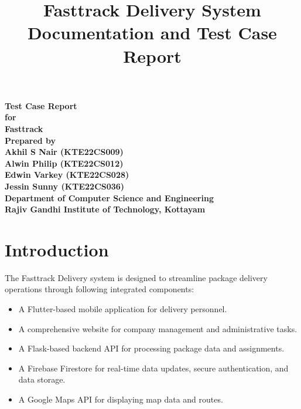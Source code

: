 \documentclass{article}
\title{Fasttrack Delivery System Documentation and Test Case Report}
\begin{document}
\begin{center}
    \textbf{\Huge Test Case Report}\\
    \vspace{30pt}
    \textbf{\Large for}\\
    \vspace{60pt}
    \textbf{\LARGE Fasttrack}\\
    \vspace{40pt}
    \textbf{\large Prepared by}\\
    \vspace{30pt}
   \textbf{\Large Akhil S Nair (KTE22CS009)}\\
\vspace{30pt}
\textbf{\Large Alwin Philip (KTE22CS012)}\\
\vspace{30pt}
\textbf{\Large Edwin Varkey (KTE22CS028)}\\
\vspace{30pt}
\textbf{\Large Jessin Sunny (KTE22CS036)}\\
    \vspace{70pt}
    \textbf{Department of Computer Science and Engineering}\\
    \vspace{20pt}
    \textbf{Rajiv Gandhi Institute of Technology, Kottayam}
\end{center}
\newpage
\tableofcontents
\newpage

\section{Introduction}
The Fasttrack Delivery system is designed to streamline package delivery operations through following integrated components:
\begin{itemize}
    \item A Flutter-based mobile application for delivery personnel.
    \item A comprehensive website for company management and administrative tasks.
    \item A Flask-based backend API for processing package data and assignments.
    \item A Firebase Firestore for real-time data updates, secure authentication, and data storage.
    \item A Google Maps API for displaying map data and routes.
\end{itemize}
\end{document}
